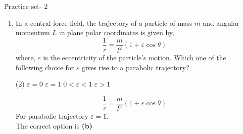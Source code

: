 \newpage
\begin{abox}
	Practice set- 2 
	\end{abox}
\begin{enumerate}
	\item In a central force field, the trajectory of a particle of mass $m$ and angular momentum $L$ in plane polar coordinates is given by,\\
	$$\frac{1}{r}=\frac{m}{l^{2}}(1+\varepsilon \cos \theta)$$
	where, $\varepsilon$ is the eccentricity of the particle's motion. Which one of the following choice for $\varepsilon$ gives rise to a parabolic trajectory?
	{}
\begin{tasks}(2)
	\task[\textbf{A.}] $\varepsilon=0$
	\task[\textbf{B.}]$\varepsilon=1$
	\task[\textbf{C.}] $0<\varepsilon<1$
	\task[\textbf{D.}] $\varepsilon>1$
\end{tasks}
\begin{answer}
	$$
	\frac{1}{r}=\frac{m}{l^{2}}(1+\varepsilon \cos \theta)
	$$
	For parabolic trajectory $\varepsilon=1$.\\
	The correct option is \textbf{(b)}
\end{answer}


\end{enumerate}
